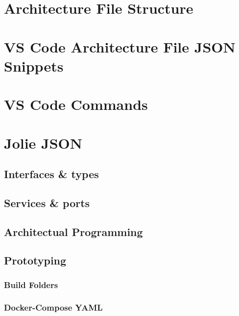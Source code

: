 \appendixpage
\noappendicestocpagenum
\addappheadtotoc
\chapter{Architecture File Structure}
\label{appen:architecture-file-structure}


\chapter{VS Code Architecture File JSON Snippets}
\label{appen:vscode_snippets}


\chapter{VS Code Commands}
\label{appen:vscode_commands}


\chapter{Jolie JSON}
\section{Interfaces \& types}
\label{appen:joliejson_iface_types}


\section{Services \& ports}
\label{appen:joliejson_services}


\section{Architectual Programming}
\label{appen:joliejson_architecture}


\section{Prototyping}
\subsection{Build Folders}
\label{appen:joliejson_prototype}

\subsection{Docker-Compose YAML}
\label{appen:docker_yaml}
